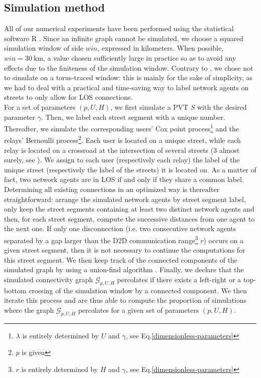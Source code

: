\documentclass[conference]{IEEEtran}
\begin{document}
\subsection{Simulation method}
All of our numerical experiments have been performed using the statistical software R \cite{team2014r}. Since an infinite graph cannot be simulated, we choose a squared simulation window of side $win$, expressed in kilometers. When possible, $win = 30 \: \text{km}$, a value chosen sufficiently large in practice so as to avoid any effects due to the finiteness of the simulation window. Contrary to \cite{cali2018percolation,mertens_continuum_2012}, we chose not to simulate on a torus-traced window: this is mainly for the sake of simplicity, as we had to deal with a practical and time-saving way to label network agents on streets to only allow for LOS connections. \\
\indent For a set of parameters $(p,U,H)$, we first simulate a PVT $S$ with the desired parameter $\gamma$. Then, we label each street segment with a unique number. Thereafter, we simulate the corresponding users' Cox point process\footnote{$\lambda$ is entirely determined by $U$ and $\gamma$, see Eq.\eqref{dimensionless-parameters}} and the relays' Bernoulli process\footnote{$p$ is given}. Each user is located on a unique street, while each relay is located on a crossroad at the intersection of several streets (3 almost surely, see \cite{okabe_spatial_1992,chiu_stochastic_2013,blaszczyszyn_stochastic_2018}). We assign to each user (respectively each relay) the label of the unique street (respectively the label of the streets) it is located on. As a matter of fact, two network agents are in LOS if and only if they share a common label. Determining all existing connections in an optimized way is thereafter straightforward: arrange the simulated network agents by street segment label, only keep the street segments containing at least two distinct network agents and then, for each street segment, compute the successive distances from one agent to the next one. If only one disconnection (i.e. two consecutive network agents separated by a gap larger than the D2D communication range\footnote{$r$ is entirely determined by $H$ and $\gamma$, see Eq.\eqref{dimensionless-parameters}} $r$) occurs on a given street segment, then it is not necessary to continue the computations for this street segment. We then keep track of the connected components of the simulated graph by using a union-find algorithm \cite{knuthart,sedgewick2011algorithms,newman2001fast}. Finally, we declare that the simulated connectivity graph $\mathcal{G}_{p,U,H}$ percolates if there exists a left-right or a top-bottom crossing of the simulation window by a connected component. We then iterate this process and are thus able to compute the proportion of simulations where the graph $\mathcal{G}_{p,U,H}$ percolates for a given set of parameters $(p,U,H)$.  \\
\indent 
\end{document}
